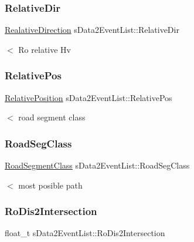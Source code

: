 \subsubsection{\texorpdfstring{Relative\+Dir}{RelativeDir}}
{\footnotesize\ttfamily \hyperlink{_psd_location_8h_ae65d9d286580719610837075ffad7232}{Realative\+Direction} s\+Data2\+Event\+List\+::\+Relative\+Dir}

$<$ Ro relative Hv \mbox{\label{structs_data2_event_list_a056ab34b1bfd87ef115c7f24de027747}} 
\subsubsection{\texorpdfstring{Relative\+Pos}{RelativePos}}
{\footnotesize\ttfamily \hyperlink{_psd_location_8h_abcb85fd51379afdf750bdda1dec9174c}{Relative\+Position} s\+Data2\+Event\+List\+::\+Relative\+Pos}

$<$ road segment class \mbox{\label{structs_data2_event_list_ac1f8a0283e7637e026de71131ab0cdc9}} 
\subsubsection{\texorpdfstring{Road\+Seg\+Class}{RoadSegClass}}
{\footnotesize\ttfamily \hyperlink{_psd_message_decoder_8h_a4f9adeb93dfc3dac7961fa97e890b1a5}{Road\+Segment\+Class} s\+Data2\+Event\+List\+::\+Road\+Seg\+Class}

$<$ most posible path \mbox{\label{structs_data2_event_list_aab749bc845a1ce305d1a28ef1bbc0d2f}} 
\subsubsection{\texorpdfstring{Ro\+Dis2\+Intersection}{RoDis2Intersection}}
{\footnotesize\ttfamily float\+\_\+t s\+Data2\+Event\+List\+::\+Ro\+Dis2\+Intersection}

